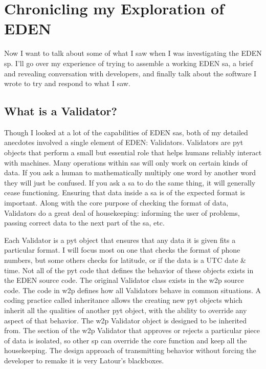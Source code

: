 \documentclass[a4paper,man,natbib,floatsintext]{apa6}
\begin{document}
  \section{Chronicling my Exploration of EDEN}
  Now I want to talk about some of what I saw when I was investigating the \gls{EDEN} \gls{sp}. I'll go over my experience of trying to assemble a working \gls{EDEN} \gls{sa}, a brief and revealing conversation with developers, and finally talk about the software I wrote to try and respond to what I saw.

  \subsection{What is a Validator?}
  Though I looked at a lot of the capabilities of \gls{EDEN} \glspl{sa}, both of my detailed anecdotes involved a single element of \gls{EDEN}: Validators. Validators are \Gls{pyt} objects that perform a small but essential role that helps humans reliably interact with machines. Many operations within \glspl{sa} will only work on certain kinds of data. If you ask a human to mathematically multiply one word by another word they will just be confused. If you ask a \gls{sa} to do the same thing, it will generally cease functioning. Ensuring that data inside a \gls{sa} is of the expected format is important. Along with the core purpose of checking the format of data, Validators do a great deal of housekeeping: informing the user of problems, passing correct data to the next part of the \gls{sa}, etc.

  Each Validator is a \Gls{pyt} object that ensures that any data it is given fits a particular format. I will focus most on one that checks the format of phone numbers, but some others checks for latitude, or if the data is a UTC date \& time. Not all of the \Gls{pyt} code that defines the behavior of these objects exists in the \gls{EDEN} source code. The original Validator class exists in the \gls{w2p} source code. The code in \gls{w2p} defines how all Validators behave in common situations. A coding practice called inheritance allows the creating new \Gls{pyt} objects which inherit all the qualities of another \Gls{pyt} object, with the ability to override any aspect of that behavior. The \gls{w2p} Validator object is designed to be inherited from. The section of the \gls{w2p} Validator that approves or rejects a particular piece of data is isolated, so other \gls{sp} can override the core function and keep all the housekeeping. The design approach of transmitting behavior without forcing the developer to remake it is very Latour's blackboxes\footnotemark.
\end{document}
